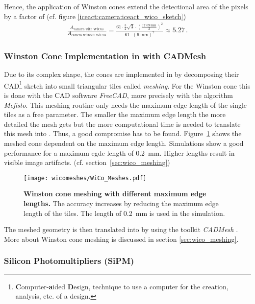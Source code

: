 Hence, the application of Winston cones extend the detectional area of the pixels by a factor of (cf. figure \ref{iceact:camera:iceact_wico_sketch})
\begin{align}
	\frac{A_\text{camera with WiCos}}{A_\text{camera without WiCos}} = \frac{61\cdot \frac{3}{2}\sqrt{3}\cdot\left(\frac{\SI{17.09}{\milli\meter}}{2}\right)^2}{61\cdot(\SI{6}{\milli\meter})^2}\approx\num{5.27}\,.
\end{align}

\subsubsection{Winston Cone Implementation in \geant with CADMesh}

Due to its complex shape, the cones are implemented in \geant by decomposing their CAD\footnote{\textbf{C}omputer-\textbf{a}ided \textbf{D}esign, technique to use a computer for the creation, analysis, etc. of a design.} sketch into small triangular tiles called \textit{meshing}. For the \iceact Winston cone this is done with the CAD software \textit{FreeCAD}, more precisely with the algorithm \textit{Mefisto}. This meshing routine only needs the maximum edge length of the single tiles as a free parameter. The smaller the maximum edge length the more detailed the mesh gets but the more computational time is needed to translate this mesh into \geant. Thus, a good compromise has to be found. Figure~\ref{wico:meshing} shows the meshed cone dependent on the maximum edge length. Simulations show a good performance for a maximum egde length of \SI{0.2}{\milli\meter}. Higher lengths result in visible image artifacts. (cf. section~\ref{sec:wico_meshing}) 

\begin{figure}[H]
	\centering
	\texttt{[image: wicomeshes/WiCo\_Meshes.pdf]}
	\caption[\iceact Winston cone meshing with different maximum edge lengths]{\textbf{\iceact Winston cone meshing with different maximum edge lengths.} The accuracy increases by reducing the maximum edge length of the tiles. The length of \SI{0.2}{\milli\meter} is used in the simulation.}
	\label{wico:meshing}	
\end{figure}

The meshed geometry is then translated into \geant by using the toolkit \textit{CADMesh} \cite{wico:cadmesh}. More about Winston cone meshing is discussed in section \ref{sec:wico_meshing}.

\subsubsection{Silicon Photomultipliers (SiPM)}\label{sec:sipm:working_principle}

